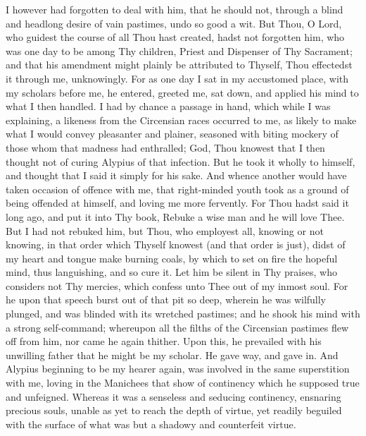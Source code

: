 \documentclass[b5paper,openright,12pt,twoside]{book}
\begin{document}
I however had forgotten to deal with him, that he should not, through
a blind and headlong desire of vain pastimes, undo so good a wit. But
Thou, O Lord, who guidest the course of all Thou hast created, hadst
not forgotten him, who was one day to be among Thy children, Priest
and Dispenser of Thy Sacrament; and that his amendment might plainly be
attributed to Thyself, Thou effectedst it through me, unknowingly. For
as one day I sat in my accustomed place, with my scholars before me,
he entered, greeted me, sat down, and applied his mind to what I
then handled. I had by chance a passage in hand, which while I was
explaining, a likeness from the Circensian races occurred to me, as
likely to make what I would convey pleasanter and plainer, seasoned
with biting mockery of those whom that madness had enthralled; God, Thou
knowest that I then thought not of curing Alypius of that infection. But
he took it wholly to himself, and thought that I said it simply for his
sake. And whence another would have taken occasion of offence with me,
that right-minded youth took as a ground of being offended at himself,
and loving me more fervently. For Thou hadst said it long ago, and put
it into Thy book, Rebuke a wise man and he will love Thee. But I had
not rebuked him, but Thou, who employest all, knowing or not knowing, in
that order which Thyself knowest (and that order is just), didst of my
heart and tongue make burning coals, by which to set on fire the
hopeful mind, thus languishing, and so cure it. Let him be silent in Thy
praises, who considers not Thy mercies, which confess unto Thee out of
my inmost soul. For he upon that speech burst out of that pit so deep,
wherein he was wilfully plunged, and was blinded with its wretched
pastimes; and he shook his mind with a strong self-command; whereupon
all the filths of the Circensian pastimes flew off from him, nor came he
again thither. Upon this, he prevailed with his unwilling father that he
might be my scholar. He gave way, and gave in. And Alypius beginning
to be my hearer again, was involved in the same superstition with me,
loving in the Manichees that show of continency which he supposed true
and unfeigned. Whereas it was a senseless and seducing continency,
ensnaring precious souls, unable as yet to reach the depth of virtue,
yet readily beguiled with the surface of what was but a shadowy and
counterfeit virtue.
\end{document}
